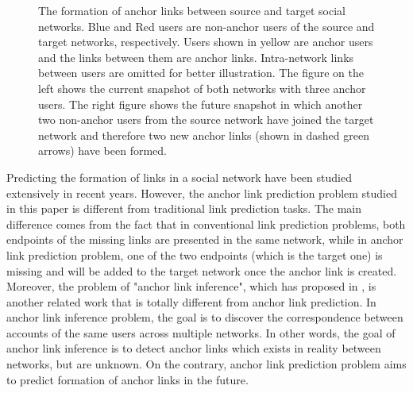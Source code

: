 \documentclass[conference]{IEEEtran}
\begin{document}
\begin{figure}[!t]
\centering
{}
\hfil
{}
\caption{The formation of anchor links between source and target social networks. Blue and Red users are non-anchor users of the source and target networks, respectively. Users shown in yellow are anchor users and the links between them are anchor links. Intra-network links between users are omitted for better illustration. The figure on the left shows the current snapshot of both networks with three anchor users. The right figure shows the future snapshot in which another two non-anchor users from the source network have joined the target network and therefore two new anchor links (shown in dashed green arrows) have been formed.}
\label{fig:intro}
\end{figure}

Predicting the formation of links in a social network have been studied extensively in recent years. However, the anchor link prediction problem studied in this paper is different from traditional link prediction tasks. The main difference comes from the fact that in conventional link prediction problems, both endpoints of the missing links are presented in the same network, while in anchor link prediction problem, one of the two endpoints (which is the target one) is missing and will be added to the target network once the anchor link is created. Moreover, the problem of "anchor link inference", which has proposed in \cite{kong2013}, is another related work that is totally different from anchor link prediction. In anchor link inference problem, the goal is to discover the correspondence between accounts of the same users across multiple networks. In other words, the goal of anchor link inference is to detect anchor links which exists in reality between networks, but are unknown. On the contrary, anchor link prediction problem aims to predict formation of anchor links in the future.
\end{document}
